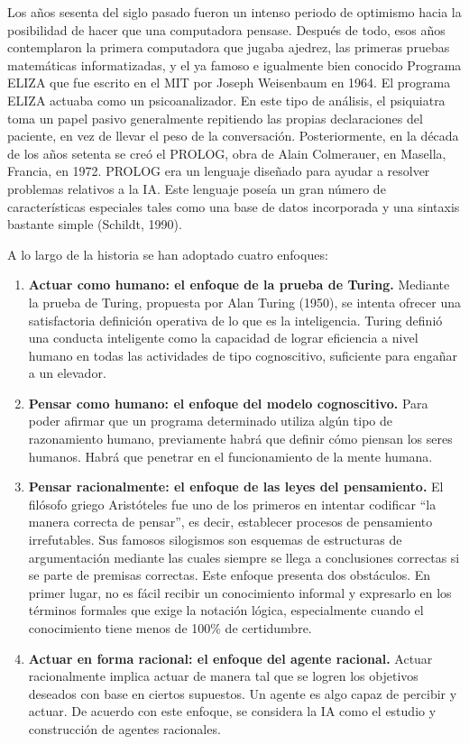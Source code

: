 Los años sesenta del siglo pasado fueron un intenso periodo de optimismo hacia la posibilidad de hacer que una computadora pensase.
Después de todo, esos años contemplaron la primera computadora que jugaba ajedrez, las
primeras pruebas matemáticas informatizadas, y el ya famoso e igualmente bien conocido
Programa ELIZA que fue escrito en el MIT por Joseph Weisenbaum en 1964. El programa ELIZA
actuaba como un psicoanalizador.
En este tipo de análisis, el psiquiatra toma un papel pasivo
generalmente repitiendo las propias declaraciones del paciente, en vez de llevar el peso
de la conversación. Posteriormente, en la década de los años setenta se creó el PROLOG,
obra de Alain Colmerauer, en Masella, Francia, en 1972. PROLOG era un lenguaje diseñado
para ayudar a resolver problemas relativos a la IA.
Este lenguaje poseía un gran número de
características especiales tales como una base de datos incorporada y una sintaxis bastante
simple (Schildt, 1990).

A lo largo de la historia se han adoptado cuatro enfoques:

\begin{enumerate}
	\item \textbf{Actuar como humano: el enfoque de la prueba de Turing.}
	Mediante la prueba de Turing, propuesta por Alan Turing (1950), se intenta ofrecer una satisfactoria
	definición operativa de lo que es la inteligencia.
	Turing definió una conducta inteligente como la capacidad de lograr eficiencia a nivel
	humano en todas las actividades de tipo cognoscitivo, suficiente para engañar a un elevador. 
	
	\item \textbf{Pensar como humano: el enfoque del modelo cognoscitivo.}
	Para poder afirmar que un programa determinado utiliza algún tipo de razonamiento humano,
	previamente habrá que definir cómo piensan los seres humanos. Habrá que penetrar en el
	funcionamiento de la mente humana.
	
	\item \textbf{Pensar racionalmente: el enfoque de las leyes del pensamiento.}
	El filósofo griego Aristóteles fue uno de los primeros en intentar codificar “la manera correcta
	de pensar”, es decir, establecer procesos de pensamiento irrefutables. Sus famosos silogismos
	son esquemas de estructuras de argumentación mediante las cuales siempre se llega a
	conclusiones correctas si se parte de premisas correctas.
	Este enfoque presenta dos obstáculos. En primer lugar, no es fácil recibir un conocimiento
	informal y expresarlo en los términos formales que exige la notación lógica, especialmente
	cuando el conocimiento tiene menos de 100\% de certidumbre.
	
	\item \textbf{Actuar en forma racional: el enfoque del agente racional.}
	Actuar racionalmente implica actuar de manera tal que se logren los objetivos deseados con
	base en ciertos supuestos. Un agente es algo capaz de percibir y actuar. De acuerdo con este
	enfoque, se considera la IA como el estudio y construcción de agentes racionales.
\end{enumerate}

